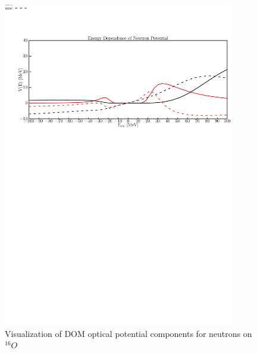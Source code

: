 \begin{figure}
\begin{center}
\includegraphics[width = 0.9\textwidth]{figures/o16_neutronPotentials.png}
\caption{Visualization of DOM optical potential components for neutrons on
$^{16}O$}
\label{o16NeutronPotentials}
\end{center}
\end{figure}

